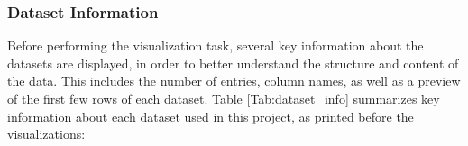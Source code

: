 \documentclass[10pt,a4paper,oneside]{article} %
\begin{document}
\subsubsection{Dataset Information}
Before performing the visualization task, several key information about the datasets are displayed, in order to better understand the structure and content of the data. This includes the number of entries, column names, as well as a preview of the first few rows of each dataset.
Table \ref{Tab:dataset_info} summarizes key information about each dataset used in this project, as printed before the visualizations:
\begin{table}[h!]
\centering
{}
\caption{Dataset Information}
\label{Tab:dataset_info}
\end{table}
\end{document}
